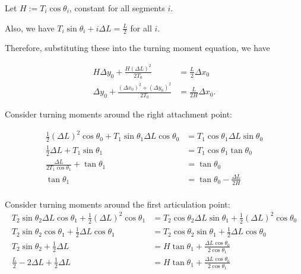 \documentclass[12pt]{article}
\begin{document}
Let $H := T_i\cos\theta_i$, constant for all segments $i$.

Also, we have $T_i\sin\theta_i + i\Delta L = \frac{L}{2}$ for all $i$.

Therefore, substituting these into the turning moment equation, we have

\begin{align*}
  H\Delta y_0 + \frac{H(\Delta L)^2}{2T_0} &= \frac{L}{2} \Delta x_0 \\
  \Delta y_0 + \frac{(\Delta x_0)^2 + (\Delta y_0)^2}{2T_0} &= \frac{L}{2H} \Delta x_0.
\end{align*}


\newpage

Consider turning moments around the right attachment point:

\begin{align*}
  \frac{1}{2}(\Delta L)^2\cos\theta_0 + T_1\sin\theta_1\Delta L \cos\theta_0 &= T_1\cos\theta_1\Delta L \sin\theta_0\\
  \frac{1}{2}\Delta L + T_1\sin\theta_1 &= T_1\cos\theta_1 \tan\theta_0\\
  \frac{\Delta L}{2T_1\cos\theta_1} + \tan\theta_1 &= \tan\theta_0\\
  \tan\theta_1 &= \tan\theta_0 - \frac{\Delta L}{2H}\\
\end{align*}

Consider turning moments around the first articulation point:
\begin{align*}
  T_2\sin\theta_2\Delta L\cos\theta_1 + \frac{1}{2}(\Delta L)^2\cos\theta_1 &=
  T_2\cos\theta_2\Delta L\sin\theta_1 + \frac{1}{2}(\Delta L)^2\cos\theta_0\\
  T_2\sin\theta_2\cos\theta_1 + \frac{1}{2}\Delta L\cos\theta_1 &=
  T_2\cos\theta_2\sin\theta_1 + \frac{1}{2}\Delta L\cos\theta_0\\
  T_2\sin\theta_2 + \frac{1}{2}\Delta L &=
  H\tan\theta_1 + \frac{\Delta L\cos\theta_0}{2\cos\theta_1}\\
  \frac{L}{2} - 2\Delta L + \frac{1}{2}\Delta L &=
  H\tan\theta_1 + \frac{\Delta L\cos\theta_0}{2\cos\theta_1}\\
\end{align*}
\end{document}
